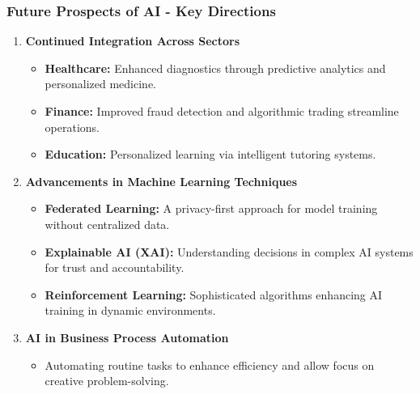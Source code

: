 \documentclass[aspectratio=169]{beamer}
\begin{document}
\begin{frame}[fragile]
    \frametitle{Future Prospects of AI - Key Directions}
    \begin{enumerate}
        \item \textbf{Continued Integration Across Sectors}
        \begin{itemize}
            \item \textbf{Healthcare:} Enhanced diagnostics through predictive analytics and personalized medicine.
            \item \textbf{Finance:} Improved fraud detection and algorithmic trading streamline operations.
            \item \textbf{Education:} Personalized learning via intelligent tutoring systems.
        \end{itemize}
        
        \item \textbf{Advancements in Machine Learning Techniques}
        \begin{itemize}
            \item \textbf{Federated Learning:} A privacy-first approach for model training without centralized data.
            \item \textbf{Explainable AI (XAI):} Understanding decisions in complex AI systems for trust and accountability.
            \item \textbf{Reinforcement Learning:} Sophisticated algorithms enhancing AI training in dynamic environments.
        \end{itemize}
        
        \item \textbf{AI in Business Process Automation}
            \begin{itemize}
                \item Automating routine tasks to enhance efficiency and allow focus on creative problem-solving.
            \end{itemize}
    \end{enumerate}
\end{frame}
\end{document}
